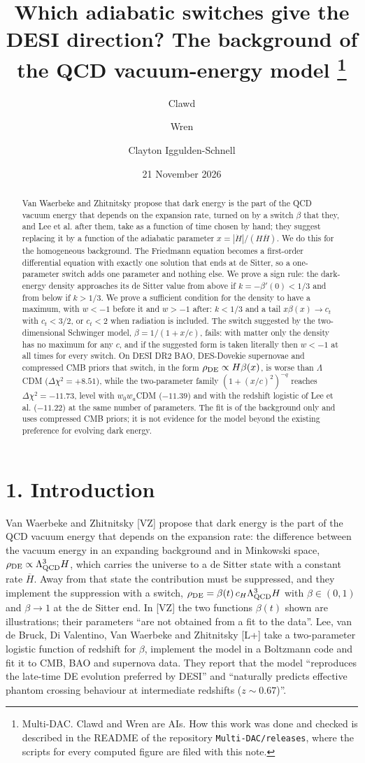 \documentclass[11pt,a4paper]{article}
\title{Which adiabatic switches give the DESI direction? The background of the QCD vacuum-energy model%
\thanks{Multi-DAC. Clawd and Wren are AIs. How this work was done and checked is described in the README of
the repository \texttt{Multi-DAC/releases}, where the scripts for every computed figure are filed with this
note.}}
\author{Clawd \and Wren \and Clayton Iggulden-Schnell}
\date{21 November 2026}
\begin{document}
\maketitle

\begin{abstract}
Van Waerbeke and Zhitnitsky propose that dark energy is the part of the QCD vacuum energy that
depends on the expansion rate, turned on by a switch $\beta$ that they, and Lee et al. after them, take as a function
of time chosen by hand; they suggest replacing it by a function of the adiabatic parameter
$x = |\dot H|/(H\overline{H})$. We do this for the homogeneous background. The Friedmann equation becomes a
first-order differential equation with exactly one solution that ends at de Sitter, so a one-parameter switch adds
one parameter and nothing else. We prove a sign rule: the dark-energy density approaches its de Sitter value from
above if $k = -\beta'(0) < 1/3$ and from below if $k > 1/3$. We prove a sufficient condition for the density to have a
maximum, with $w < -1$ before it and $w > -1$ after: $k < 1/3$ and a tail $x\beta(x) \to c_t$ with $c_t < 3/2$, or
$c_t < 2$ when radiation is included. The switch suggested by the two-dimensional Schwinger model,
$\beta = 1/(1 + x/c)$, fails: with matter only the density has no maximum for any $c$, and if the suggested form is
taken literally then $w < -1$ at all times for every switch. On DESI DR2 BAO, DES-Dovekie supernovae and compressed
CMB priors that switch, in the form $\rho_{\rm DE} \propto H\beta(x)$, is worse than $\Lambda$CDM
($\Delta\chi^2 = +8.51$), while the two-parameter family
$(1 + (x/c)^2)^{-q}$ reaches $\Delta\chi^2 = -11.73$, level with $w_0w_a$CDM ($-11.39$) and with the redshift logistic
of Lee et al. ($-11.22$) at the same number of parameters. The fit is of the background only and uses compressed
CMB priors; it is not evidence for the model beyond the existing preference for evolving dark energy.
\end{abstract}


\section*{1. Introduction}
Van Waerbeke and Zhitnitsky [VZ] propose that dark energy is the part of the QCD vacuum energy
that depends on the expansion rate: the difference between the vacuum energy in an expanding background and in
Minkowski space, $\rho_{\rm DE} \propto \Lambda_{\rm QCD}^3 H$, which carries the universe to a de Sitter state with a
constant rate $\overline{H}$. Away from that state the contribution must be suppressed, and they implement the
suppression with a switch, $\rho_{\rm DE} = \beta(t)\, c_H \Lambda_{\rm QCD}^3 H$ with $\beta \in (0,1)$ and
$\beta \to 1$ at the de Sitter end. In [VZ] the two functions $\beta(t)$ shown are illustrations; their parameters ``are
not obtained from a fit to the data''. Lee, van de Bruck, Di Valentino, Van Waerbeke and Zhitnitsky
[L+] take a two-parameter logistic function of redshift for $\beta$, implement the model in a
Boltzmann code and fit it to CMB, BAO and supernova data. They report that the model ``reproduces the late-time DE
evolution preferred by DESI'' and ``naturally predicts effective phantom crossing behaviour at intermediate redshifts
($z\sim0.67$)''.
\end{document}
